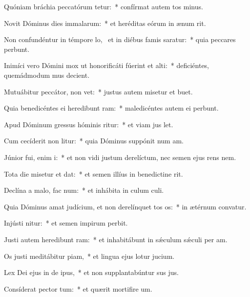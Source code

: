 \item Quóniam bráchia peccatórum tetur:~* confírmat autem tos minus.
\item Novit Dóminus dies immalarum:~* et heréditas eórum in ænum rit.
\item Non confundéntur in témpore lo,~\pscross{} et in diébus famis saratur:~* quia peccares perbunt.
\item Inimíci vero Dómini mox ut honorificáti fúerint et alti:~* deficiéntes, quemádmodum mus decient.
\item Mutuábitur peccátor,  non vet:~* justus autem misetur et buet.
\item Quia benedicéntes ei heredibunt ram:~* maledicéntes autem ei perbunt.
\item Apud Dóminum gressus hóminis ritur:~* et viam jus let.
\item Cum cecíderit non litur:~* quia Dóminus suppónit num am.
\item Júnior fui, enim i:~* et non vidi justum derelíctum, nec semen ejus rens nem.
\item Tota die misetur et dat:~* et semen illíus in benedictine rit.
\item Declína a malo,  fac num:~* et inhábita in culum culi.
\item Quia Dóminus amat judícium, et non derelínquet tos os:~* in ætérnum convatur.
\item Injústi nitur:~* et semen impirum perbit.
\item Justi autem heredibunt ram:~* et inhabitábunt in sǽculum sǽculi per am.
\item Os justi meditábitur piam,~* et lingua ejus lotur jucium.
\item Lex Dei ejus in de ipus,~* et non supplantabúntur sus jus.
\item Consíderat pector tum:~* et quærit mortifire um.
